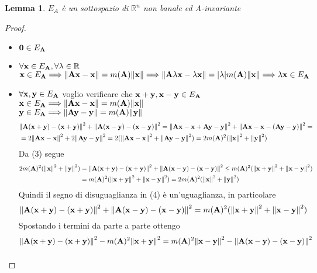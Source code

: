 \documentclass[10pt,a4paper]{book}
\newtheorem{lemma}[theorem]{Lemma}
\begin{document}
\begin{lemma}
$E_A$ è un sottospazio di $\mathbb{R}^{n}$ non banale ed A-invariante
\end{lemma} 
\begin{proof}
\begin{itemize}
\item $\vb{0} \in E_{\vb{A}} $  
\item $\forall \vb{x} \in E_{\vb{A}}, \forall \lambda \in \mathbb{R}$ \\
$\vb{x} \in E_{\vb{A}} \Longrightarrow \norm{\vb{Ax-x}} = m(\vb{A})\norm{\vb{x}} \Longrightarrow \norm{\vb{A} \lambda \vb{x} -\lambda \vb{x}}= | \lambda | m(\vb{A}) \norm{\vb{x}}  \Longrightarrow \lambda \vb{x} \in E_{\vb{A}} $
\item $\forall \vb{x, y} \in E_{\vb{A}} $ voglio verificare che $\vb{x+y, x-y} \in E_{\vb{A}}$ \\
$\vb{x} \in E_{\vb{A}} \Longrightarrow \norm{\vb{Ax-x}} = m(\vb{A})\norm{\vb{x}}$ \\
$\vb{y} \in E_{\vb{A}} \Longrightarrow \norm{\vb{Ay-y}} = m(\vb{A})\norm{\vb{y}}$ 
\begin{equation} 
\begin{split}
& \norm{\vb{A(x+y) - (x+y)}}^2 + \norm{\vb{A(x-y) - (x-y)}}^2  = \norm{\vb{Ax - x + Ay -y}}^2 + \norm{\vb{Ax - x -(Ay -y)}}^2 = \\
& = 2 \norm{\vb{Ax-x}}^2 + 2 \norm{\vb{Ay -y}}^2  = 2( \norm{\vb{Ax-x}}^2 + \norm{\vb{Ay-y}}^2) = 2m(\vb{A})^2(\norm{\vb{x}}^2 + \norm{\vb{y}}^2) 
\end{split}
\end{equation}
Da (3) segue 
\begin{equation} 
\begin{split}
2m(\vb{A})^2(\norm{\vb{x}}^2 + \norm{\vb{y}}^2) & = \norm{\vb{A(x+y) - (x+y)}}^2 + \norm{\vb{A(x-y) - (x-y)}}^2 \leq m(\vb{A})^2(\norm{\vb{x+y}}^2 + \norm{\vb{x-y}}^2) \\ 
& = m(\vb{A})^2(\norm{\vb{x+y}}^2 + \norm{\vb{x-y}}^2)  = 2m(\vb{A})^2(\norm{\vb{x}}^2 + \norm{\vb{y}}^2)
\end{split}
\end{equation}
Quindi il segno di disuguaglianza in (4) è un'uguaglianza, in particolare 
\[   \norm{\vb{A(x+y) - (x+y)}}^2 + \norm{\vb{A(x-y) - (x-y)}}^2  = m(\vb{A})^2(\norm{\vb{x+y}}^2 + \norm{\vb{x-y}}^2)  \]
Spostando i termini da parte a parte ottengo
\[ \norm{\vb{A(x+y) - (x+y)}}^2 - m(\vb{A})^2 \norm{\vb{x+y}}^2=  m(\vb{A})^2 \norm{\vb{x-y}}^2 - \norm{\vb{A(x-y) - (x-y)}}^2 \]
\begin{equation} 

\end{equation}
\end{itemize}
\end{proof}
\end{document}
